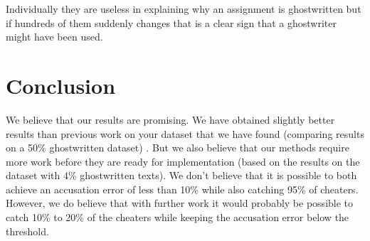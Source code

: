 \documentclass[11pt]{article}
\begin{document}
    Individually they are useless in explaining why an assignment is
    ghostwritten but if hundreds of them suddenly changes that is a clear sign
    that a ghostwriter might have been used.


    \section{Conclusion}

    We believe that our results are promising. We have obtained slightly better
    results than previous work on your dataset that we have found (comparing
    results on a 50\% ghostwritten dataset) \citep{hansen2014,aalykke2016}. But
    we also believe that our methods require more work before they are ready for
    implementation (based on the results on the dataset with 4\% ghostwritten
    texts). We don't believe that it is possible to both achieve an accusation
    error of less than 10\% while also catching 95\% of cheaters. However, we
    do believe that with further work it would probably be possible to catch
    10\% to 20\% of the cheaters while keeping the accusation error below the
    threshold.

    \newpage
    
    
\end{document}
